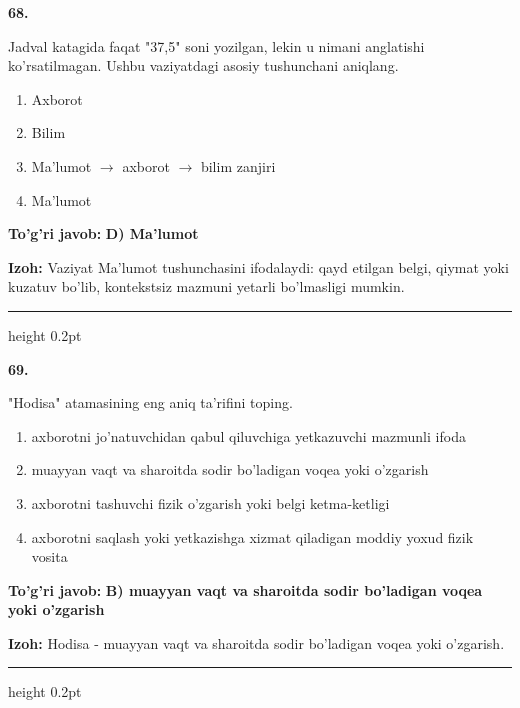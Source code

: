 \documentclass[10pt,a4paper,oneside]{article}
\begin{document}
\noindent\textbf{\color{ink}68.}
\par
Jadval katagida faqat "37,5" soni yozilgan, lekin u nimani anglatishi ko'rsatilmagan. Ushbu vaziyatdagi asosiy tushunchani aniqlang.
\begin{enumerate}[label=\Alph*),leftmargin=9mm]
\item Axborot
\item Bilim
\item Ma'lumot \ensuremath{\to} axborot \ensuremath{\to} bilim zanjiri
\item Ma'lumot
\end{enumerate}
\begin{tcolorbox}[enhanced,breakable,colback=teal!4,colframe=teal!50!black,boxrule=0.5pt,arc=1.1mm,left=3mm,right=3mm,top=1.7mm,bottom=1.7mm,before skip=2mm,after skip=2mm]
\textbf{\color{teal}To'g'ri javob:} \textbf{D) Ma'lumot}
\par\smallskip
\textbf{Izoh:} Vaziyat Ma'lumot tushunchasini ifodalaydi: qayd etilgan belgi, qiymat yoki kuzatuv bo'lib, kontekstsiz mazmuni yetarli bo'lmasligi mumkin.
\end{tcolorbox}
\vspace{2mm}\hrule height 0.2pt \vspace{3mm}

\noindent\textbf{\color{ink}69.}
\par
"Hodisa" atamasining eng aniq ta'rifini toping.
\begin{enumerate}[label=\Alph*),leftmargin=9mm]
\item axborotni jo'natuvchidan qabul qiluvchiga yetkazuvchi mazmunli ifoda
\item muayyan vaqt va sharoitda sodir bo'ladigan voqea yoki o'zgarish
\item axborotni tashuvchi fizik o'zgarish yoki belgi ketma-ketligi
\item axborotni saqlash yoki yetkazishga xizmat qiladigan moddiy yoxud fizik vosita
\end{enumerate}
\begin{tcolorbox}[enhanced,breakable,colback=teal!4,colframe=teal!50!black,boxrule=0.5pt,arc=1.1mm,left=3mm,right=3mm,top=1.7mm,bottom=1.7mm,before skip=2mm,after skip=2mm]
\textbf{\color{teal}To'g'ri javob:} \textbf{B) muayyan vaqt va sharoitda sodir bo'ladigan voqea yoki o'zgarish}
\par\smallskip
\textbf{Izoh:} Hodisa - muayyan vaqt va sharoitda sodir bo'ladigan voqea yoki o'zgarish.
\end{tcolorbox}
\vspace{2mm}\hrule height 0.2pt \vspace{3mm}
\end{document}
